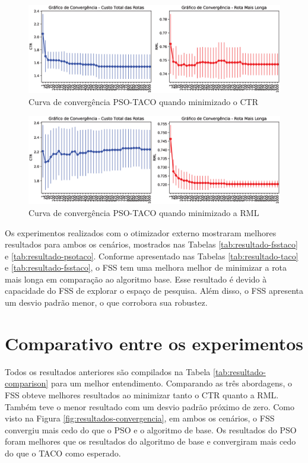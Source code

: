 \begin{figure}[htb]
    \centering
    \caption{Curva de convergência PSO-TACO quando minimizado o CTR} \label{fig:resultados-convergencia-pso-tcr}
    \includegraphics[width=\textwidth]{imagens/convergence-totalcost-psotaco.eps}
\end{figure}

\begin{figure}[htb]
    \centering
    \caption{Curva de convergência PSO-TACO quando minimizado a RML} \label{fig:resultados-convergencia-pso-rml}
    \includegraphics[width=\textwidth]{imagens/convergence-maxcost-psotaco.eps}
\end{figure}

Os experimentos realizados com o otimizador externo mostraram melhores resultados para ambos os cenários, mostrados nas Tabelas \ref{tab:resultado-fsstaco} e \ref{tab:resultado-psotaco}. Conforme apresentado nas Tabelas \ref{tab:resultado-taco} e \ref{tab:resultado-fsstaco}, o FSS tem uma melhora melhor de minimizar a rota mais longa em comparação ao algoritmo base. Esse resultado é devido à capacidade do FSS de explorar o espaço de pesquisa. Além disso, o FSS apresenta um desvio padrão menor, o que corrobora sua robustez.

\section{Comparativo entre os experimentos}
\label{sec-resultados-taco}

Todos os resultados anteriores são compilados na Tabela \ref{tab:resultado-comparison} para um melhor entendimento. Comparando as três abordagens, o FSS obteve melhores resultados ao minimizar tanto o CTR quanto a RML. Também teve o menor resultado com um desvio padrão próximo de zero. Como visto na Figura \ref{fig:resultados-convergencia}, em ambos os cenários, o FSS convergiu mais cedo do que o PSO e o algoritmo de base. Os resultados do PSO foram melhores que os resultados do algoritmo de base e convergiram mais cedo do que o TACO como esperado.

